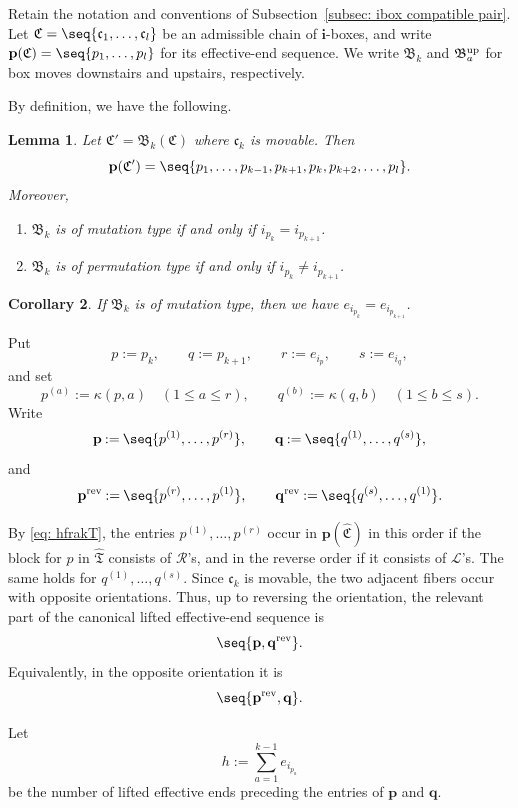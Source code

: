 \documentclass[12pt, leqno]{amsart}
\numberwithin{equation}{section}
\theoremstyle{plain}
\newtheorem{lemma}{Lemma}[section]
\newtheorem{corollary}[lemma]{Corollary}
\theoremstyle{definition}
\renewcommand{\le}{\leqslant}
\newcommand{\seteq}{\mathbin{:=}}
\newcommand{\rev}{{\rm rev}}
\newcommand{\up}{{\rm up}}
\newcommand{\frakB}{\mathfrak{B}}
\newcommand{\frakC}{\mathfrak{C}}
\newcommand{\frakT}{\mathfrak{T}}
\newcommand{\frakc}{\mathfrak{c}}
\newcommand{\hfrakT}{{\widehat{\frakT}}}
\newcommand{\hfrakC}{\widehat{\frakC}}
\newcommand{\bfi}{\mathbf{i}}
\newcommand{\bfp}{\mathbf{p}}
\newcommand{\bfq}{\mathbf{q}}
\newcommand{\calL}{\mathcal{L}}
\newcommand{\calR}{\mathcal{R}}
\newcommand{\ee}{\end{enumerate}}
\newcommand{\bna}{\begin{enumerate}[{\rm (a)}]}
\begin{document}
Retain the notation and conventions of
Subsection~\ref{subsec: ibox compatible pair}.
Let
$\frakC=\seq{\frakc_1,\ldots,\frakc_l}$
be an admissible chain of $\bfi$-boxes, and write
$\bfp(\frakC)=\seq{p_1,\ldots,p_l}$ for its effective-end sequence.
We write $\frakB_k$ and $\frakB_a^\up$ for box moves downstairs and
upstairs, respectively.

By definition, we have the following.

\begin{lemma}\label{lem: effective ends under box move}
Let
$\frakC'=\frakB_k(\frakC)$ where $\frakc_k$ is movable. Then
\[
\bfp(\frakC') = \seq{p_1,\ldots,p_{k-1},p_{k+1},p_k,p_{k+2},\ldots,p_l}.
\]
Moreover,
\bna
\item $\frakB_k$ is of mutation type if and only if $i_{p_k}=i_{p_{k+1}}$.
\item $\frakB_k$ is of permutation type if and only if $i_{p_k}\ne i_{p_{k+1}}$.
\ee
\end{lemma}

\begin{corollary}\label{cor: equal fiber sizes under mutation box move}
If $\frakB_k$ is of mutation type, then we have $e_{i_{p_k}}=e_{i_{p_{k+1}}}$.
\end{corollary}

Put
\[
p\seteq p_k,\qquad q\seteq p_{k+1},\qquad r\seteq e_{i_p},\qquad s\seteq e_{i_q},
\]
and set
\[
p^{(a)}\seteq\kappa(p,a) \quad(1\le a\le r), \qquad q^{(b)}\seteq\kappa(q,b) \quad(1\le b\le s).
\]
Write
\[
\bfp\seteq \seq{p^{(1)},\ldots,p^{(r)}}, \qquad \bfq\seteq \seq{q^{(1)},\ldots,q^{(s)}},
\]
and
\[
\bfp^{\rev}\seteq \seq{p^{(r)},\ldots,p^{(1)}}, \qquad \bfq^{\rev}\seteq \seq{q^{(s)},\ldots,q^{(1)}}.
\]

 By \eqref{eq: hfrakT}, the entries
$p^{(1)},\ldots,p^{(r)}$ occur in $\bfp(\hfrakC)$ in this order
if the block for $p$ in $\hfrakT$ consists of $\calR$'s, and
in the reverse order if it consists of $\calL$'s.
The same holds for $q^{(1)},\ldots,q^{(s)}$.{}  Since $\frakc_k$ is movable, the
two adjacent fibers occur with opposite orientations. Thus, up to
reversing the orientation, the relevant part of the canonical lifted
effective-end sequence is
\begin{equation}\label{eq: local lifted effective ends}
\seq{\bfp,\bfq^{\rev}}.
\end{equation}
Equivalently, in the opposite orientation it is
\[
\seq{\bfp^{\rev},\bfq}.
\]

Let
\[
h\seteq\sum_{a=1}^{k-1}e_{i_{p_a}}
\]
be the number of lifted effective ends  preceding the entries of $\bfp$ and $\bfq$.
\end{document}
